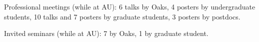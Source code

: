 \begin{veryTightItemize}
    \item Professional meetings (while at AU): 6 talks by Oaks,
        4 posters by undergraduate students,
        10 talks and 7 posters by graduate students,
        3 posters by postdocs.
    \item Invited seminars (while at AU): 7 by Oaks, 1 by graduate student.
\end{veryTightItemize}
